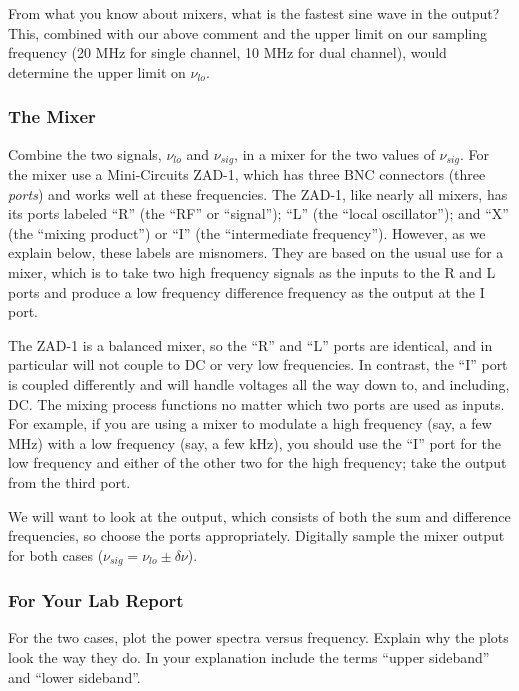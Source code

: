 \documentclass[11pt]{article}
\begin{document}
        From what you know about mixers, what is the fastest sine wave
in the output? This, combined with our above comment and the upper limit
on our sampling frequency (20 MHz for single channel, 10 MHz for dual
channel), would determine the upper limit on $\nu_{lo}$.

\subsubsection{The Mixer}

Combine the two signals, $\nu_{lo}$ and $\nu_{sig}$, in a mixer for the
two values of $\nu_{sig}$.  For the mixer use a Mini-Circuits
ZAD-1, which has three BNC connectors (three {\it ports}) and works well
at these frequencies.  The ZAD-1, like nearly all mixers, has its ports
labeled ``R'' (the ``RF'' or ``signal''); ``L'' (the ``local
oscillator''); and ``X'' (the ``mixing product'') or ``I'' (the
``intermediate frequency'').  However, as we explain below, these labels
are misnomers.  They are based on the usual use for a mixer, which is to
take two high frequency signals as the inputs to the R and L ports and
produce a low frequency difference frequency as the output at the I
port.

        The ZAD-1 is a balanced mixer, so the ``R'' and ``L'' ports are
identical, and in particular will not couple to DC or very low
frequencies.  In contrast, the ``I'' port is coupled differently and
will handle voltages all the way down to, and including, DC.  The mixing
process functions no matter which two ports are used as inputs.  For
example, if you are using a mixer to modulate a high frequency (say, a
few MHz) with a low frequency (say, a few kHz), you should use the ``I''
port for the low frequency and either of the other two for the high
frequency; take the output from the third port.

We will want to look at the output, which consists of both the sum
and difference frequencies, so choose the ports appropriately. Digitally
sample the mixer output for both cases ($\nu_{sig} = \nu_{lo} \pm \delta
\nu$).

\subsubsection{For Your Lab Report} \label{digsamp}

        For the two cases, plot the power spectra versus
frequency. Explain why the plots look the way they do. In your
explanation include the terms ``upper sideband'' and ``lower sideband''.
\end{document}
